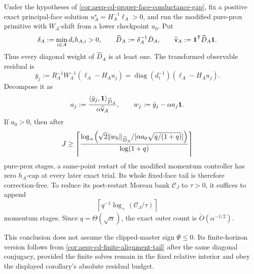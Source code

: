 \begin{corollary}
\label{cor:aesp-cd-proper-face-conductance-alignment-tail}
Under the hypotheses of
\cref{cor:aesp-cd-proper-face-conductance-gap}, fix a positive exact
principal-face solution \(u_A^\star=H_A^{-1}\ell_A>0\), and run the modified
pure-prox primitive with \(W_A\)-shift from a lower checkpoint \(u_0\).
Put
\begin{equation*}
 \delta_A:=\min_{i\in A}d_ih_{A,i}>0,
 \qquad
 \widehat D_A:=\delta_A^{-1}\bar D_A,
 \qquad
 \widehat{\mathsf v}_A:=\mathbf{1}^{\mathsf T}\widehat D_A\mathbf{1}.
\end{equation*}
Thus every diagonal weight of \(\widehat D_A\) is at least one.  The
transformed observable residual is
\begin{equation}
 \bar y_j
 :=R_A^{-1}W_A^{-1}(\ell_A-H_Au_j)
 =\operatorname{diag}(d_i^{-1})(\ell_A-H_Au_j).
 \label{eq:aesp-cd-proper-face-observable-residual}
\end{equation}
Decompose it as
\begin{equation*}
 a_j
 :=\frac{\langle\bar y_j,\mathbf{1}\rangle_{\widehat D_A}}
          {\alpha\widehat{\mathsf v}_A},
 \qquad
 w_j:=\bar y_j-\alpha a_j\mathbf{1}.
\end{equation*}
If \(a_0>0\), then after
\begin{equation}
 J\geq
 \left\lceil
 \frac{\log_+\!\left(
  \sqrt2\lVert w_0\rVert_{\widehat D_A}/
  [\alpha a_0\sqrt{q/(1+q)}]
 \right)}{\log(1+q)}
 \right\rceil
 \label{eq:aesp-cd-proper-face-conductance-alignment-work}
\end{equation}
pure-prox stages, a same-point restart of the modified momentum controller
has zero \(h_A\)-cap at every later exact trial.  Its whole fixed-face tail
is therefore correction-free.  To reduce its post-restart Moreau bank
\(\mathcal C_J\) to \(\tau>0\), it suffices to append
\begin{equation*}
 \left\lceil q^{-1}\log_+(\mathcal C_J/\tau)\right\rceil
\end{equation*}
momentum stages.  Since \(q=\Theta(\sqrt\alpha)\), the exact outer count is
\(\widetilde O(\alpha^{-1/2})\).

This conclusion does not assume the clipped-master sign
\(\Psi\leq0\).  Its finite-horizon version follows from
\cref{cor:aesp-cd-finite-alignment-tail} after the same diagonal conjugacy,
provided the finite solves remain in the fixed relative interior and obey
the displayed corollary's absolute residual budget.
\end{corollary}

